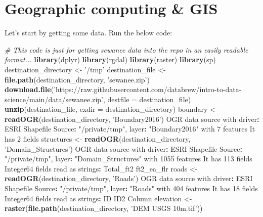 \documentclass[
]{book}
\newenvironment{Shaded}{\begin{snugshade}}{\end{snugshade}}
\newcommand{\CommentTok}[1]{\textcolor[rgb]{0.56,0.35,0.01}{\textit{#1}}}
\newcommand{\DataTypeTok}[1]{\textcolor[rgb]{0.13,0.29,0.53}{#1}}
\newcommand{\DecValTok}[1]{\textcolor[rgb]{0.00,0.00,0.81}{#1}}
\newcommand{\KeywordTok}[1]{\textcolor[rgb]{0.13,0.29,0.53}{\textbf{#1}}}
\newcommand{\NormalTok}[1]{#1}
\newcommand{\OperatorTok}[1]{\textcolor[rgb]{0.81,0.36,0.00}{\textbf{#1}}}
\newcommand{\StringTok}[1]{\textcolor[rgb]{0.31,0.60,0.02}{#1}}
\begin{document}
\hypertarget{geographic-computing-gis}{%
\chapter{Geographic computing \& GIS}\label{geographic-computing-gis}}

Let's start by getting some data. Run the below code:

\begin{Shaded}
\begin{Highlighting}[]

\CommentTok{# This code is just for getting sewanee data into the repo in an easily readable format...}
\KeywordTok{library}\NormalTok{(dplyr)}
\KeywordTok{library}\NormalTok{(rgdal)}
\KeywordTok{library}\NormalTok{(raster)}
\KeywordTok{library}\NormalTok{(sp)}
\NormalTok{destination_directory <-}\StringTok{ '/tmp'}
\NormalTok{destination_file <-}\StringTok{ }\KeywordTok{file.path}\NormalTok{(destination_directory, }\StringTok{'sewanee.zip'}\NormalTok{)}
\KeywordTok{download.file}\NormalTok{(}\StringTok{'https://raw.githubusercontent.com/databrew/intro-to-data-science/main/data/sewanee.zip'}\NormalTok{,}
              \DataTypeTok{destfile =}\NormalTok{ destination_file)}
\KeywordTok{unzip}\NormalTok{(destination_file, }\DataTypeTok{exdir =}\NormalTok{ destination_directory)}
\NormalTok{boundary <-}\StringTok{ }\KeywordTok{readOGR}\NormalTok{(destination_directory, }\StringTok{'Boundary2016'}\NormalTok{)}
\NormalTok{OGR data source with driver}\OperatorTok{:}\StringTok{ }\NormalTok{ESRI Shapefile }
\NormalTok{Source}\OperatorTok{:}\StringTok{ "/private/tmp"}\NormalTok{, layer}\OperatorTok{:}\StringTok{ "Boundary2016"}
\NormalTok{with }\DecValTok{7}\NormalTok{ features}
\NormalTok{It has }\DecValTok{2}\NormalTok{ fields}
\NormalTok{structures <-}\StringTok{ }\KeywordTok{readOGR}\NormalTok{(destination_directory, }\StringTok{'Domain_Structures'}\NormalTok{)}
\NormalTok{OGR data source with driver}\OperatorTok{:}\StringTok{ }\NormalTok{ESRI Shapefile }
\NormalTok{Source}\OperatorTok{:}\StringTok{ "/private/tmp"}\NormalTok{, layer}\OperatorTok{:}\StringTok{ "Domain_Structures"}
\NormalTok{with }\DecValTok{1055}\NormalTok{ features}
\NormalTok{It has }\DecValTok{113}\NormalTok{ fields}
\NormalTok{Integer64 fields read as strings}\OperatorTok{:}\StringTok{  }\NormalTok{Total_ft2 ft2_ea_flr }
\NormalTok{roads <-}\StringTok{ }\KeywordTok{readOGR}\NormalTok{(destination_directory, }\StringTok{'Roads'}\NormalTok{)}
\NormalTok{OGR data source with driver}\OperatorTok{:}\StringTok{ }\NormalTok{ESRI Shapefile }
\NormalTok{Source}\OperatorTok{:}\StringTok{ "/private/tmp"}\NormalTok{, layer}\OperatorTok{:}\StringTok{ "Roads"}
\NormalTok{with }\DecValTok{404}\NormalTok{ features}
\NormalTok{It has }\DecValTok{18}\NormalTok{ fields}
\NormalTok{Integer64 fields read as strings}\OperatorTok{:}\StringTok{  }\NormalTok{ID ID2 Column }
\NormalTok{elevation <-}\StringTok{ }\KeywordTok{raster}\NormalTok{(}\KeywordTok{file.path}\NormalTok{(destination_directory,}
                              \StringTok{'DEM USGS 10m.tif'}\NormalTok{))}
\end{Highlighting}
\end{Shaded}
\end{document}
